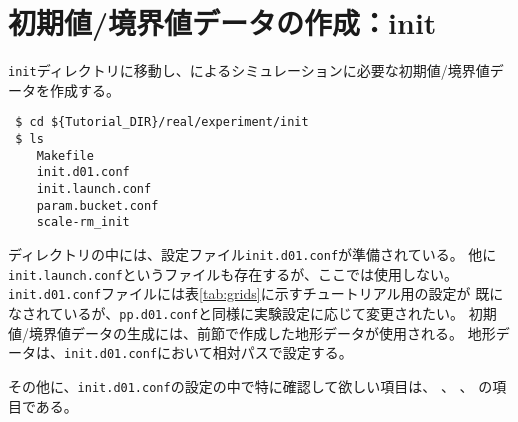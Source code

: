 \section{初期値/境界値データの作成：init} \label{sec:tutrial_real_init}

\verb|init|ディレクトリに移動し、\scalerm によるシミュレーションに必要な初期値/境界値データを作成する。
\begin{verbatim}
 $ cd ${Tutorial_DIR}/real/experiment/init
 $ ls
    Makefile
    init.d01.conf
    init.launch.conf
    param.bucket.conf
    scale-rm_init
\end{verbatim}
ディレクトリの中には、設定ファイル\verb|init.d01.conf|が準備されている。
他に\verb|init.launch.conf|というファイルも存在するが、ここでは使用しない。
\verb|init.d01.conf|ファイルには表\ref{tab:grids}に示すチュートリアル用の設定が
既になされているが、\verb|pp.d01.conf|と同様に実験設定に応じて変更されたい。
初期値/境界値データの生成には、前節で作成した地形データが使用される。
地形データは、\verb|init.d01.conf|において相対パスで設定する。

その他に、\verb|init.d01.conf|の設定の中で特に確認して欲しい項目は、
、
、
の項目である。

